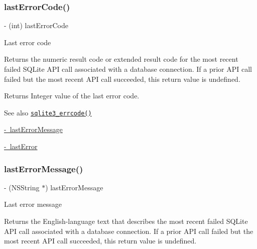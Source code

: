 \subsubsection{\texorpdfstring{last\+Error\+Code()}{lastErrorCode()}}
{\footnotesize\ttfamily -\/ (int) last\+Error\+Code \begin{DoxyParamCaption}{ }\end{DoxyParamCaption}}

Last error code

Returns the numeric result code or extended result code for the most recent failed S\+Q\+Lite A\+PI call associated with a database connection. If a prior A\+PI call failed but the most recent A\+PI call succeeded, this return value is undefined.

\begin{DoxyReturn}{Returns}
Integer value of the last error code.
\end{DoxyReturn}
\begin{DoxySeeAlso}{See also}
\href{http://sqlite.org/c3ref/errcode.html}{\tt sqlite3\+\_\+errcode()} 

\mbox{\hyperlink{interface_o_p_t_l_y_f_m_d_b_database_a082c5d58576df07956308656064e1f63}{-\/ last\+Error\+Message}} 

\mbox{\hyperlink{interface_o_p_t_l_y_f_m_d_b_database_a477a6ff4d9daaac53a56c0a058a0d2f7}{-\/ last\+Error}} 
\end{DoxySeeAlso}
\mbox{\label{interface_o_p_t_l_y_f_m_d_b_database_a082c5d58576df07956308656064e1f63}} 
\subsubsection{\texorpdfstring{last\+Error\+Message()}{lastErrorMessage()}}
{\footnotesize\ttfamily -\/ (N\+S\+String $\ast$) last\+Error\+Message \begin{DoxyParamCaption}{ }\end{DoxyParamCaption}}

Last error message

Returns the English-\/language text that describes the most recent failed S\+Q\+Lite A\+PI call associated with a database connection. If a prior A\+PI call failed but the most recent A\+PI call succeeded, this return value is undefined.

